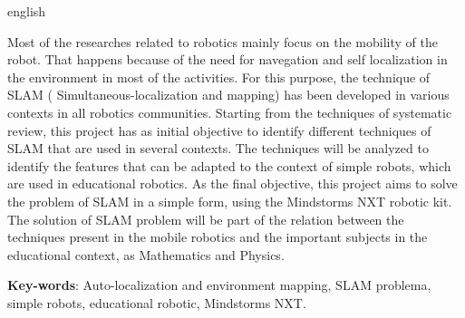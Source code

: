 \begin{resumo}[Abstract]
 \begin{otherlanguage*}{english}
   
   Most of the researches related to robotics mainly focus on the mobility of the robot. That happens because of the need for navegation and self localization in the environment in most of the activities. For this purpose, the technique of SLAM ( Simultaneous-localization and mapping) has been developed in various contexts in all robotics communities. Starting from the techniques of systematic review, this project has as initial objective to identify different techniques of SLAM that are used in several contexts. The techniques will be analyzed to identify  the features that can be adapted to the context of simple robots, which are used in educational robotics. As the final objective, this project aims to solve the problem of SLAM in a simple form, using the Mindstorms NXT robotic kit. The solution of SLAM problem will be part of the relation between the techniques present in the mobile robotics and the important subjects in the educational context, as Mathematics and Physics.

   \vspace{\onelineskip}
 
   \noindent 
   \textbf{Key-words}: Auto-localization and environment mapping, SLAM problema, simple robots, educational robotic, Mindstorms NXT.
 \end{otherlanguage*}
\end{resumo}
